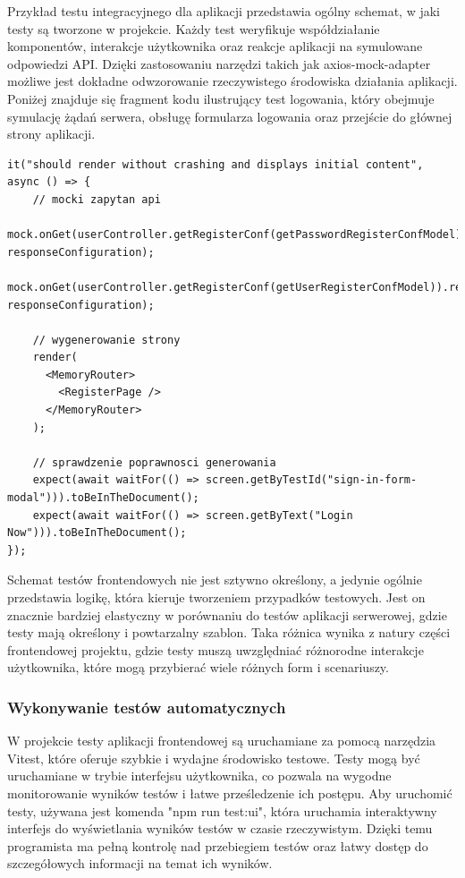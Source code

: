 \documentclass[twoside]{projektInzynierskiMS1}
\begin{document}
\newpage

\noindent
Przykład testu integracyjnego dla aplikacji przedstawia ogólny schemat, w jaki testy są tworzone w projekcie. Każdy test weryfikuje współdziałanie komponentów, interakcje użytkownika oraz reakcje aplikacji na symulowane odpowiedzi API. Dzięki zastosowaniu narzędzi takich jak axios-mock-adapter możliwe jest dokładne odwzorowanie rzeczywistego środowiska działania aplikacji. Poniżej znajduje się fragment kodu ilustrujący test logowania, który obejmuje symulację żądań serwera, obsługę formularza logowania oraz przejście do głównej strony aplikacji.

\vspace{0.5cm}
\begin{lstlisting}[language=JSX]
it("should render without crashing and displays initial content", async () => {
    // mocki zapytan api
    mock.onGet(userController.getRegisterConf(getPasswordRegisterConfModel)).reply(200, responseConfiguration);
    mock.onGet(userController.getRegisterConf(getUserRegisterConfModel)).reply(200, responseConfiguration);

    // wygenerowanie strony
    render(
      <MemoryRouter>
        <RegisterPage />
      </MemoryRouter>
    );

    // sprawdzenie poprawnosci generowania
    expect(await waitFor(() => screen.getByTestId("sign-in-form-modal"))).toBeInTheDocument();
    expect(await waitFor(() => screen.getByText("Login Now"))).toBeInTheDocument();
});
\end{lstlisting}
\vspace{0.5cm}

\noindent
Schemat testów frontendowych nie jest sztywno określony, a jedynie ogólnie przedstawia logikę, która kieruje tworzeniem przypadków testowych. Jest on znacznie bardziej elastyczny w porównaniu do testów aplikacji serwerowej, gdzie testy mają określony i powtarzalny szablon. Taka różnica wynika z natury części frontendowej projektu, gdzie testy muszą uwzględniać różnorodne interakcje użytkownika, które mogą przybierać wiele różnych form i scenariuszy.

\newpage

\subsubsection{Wykonywanie testów automatycznych}

\noindent
W projekcie testy aplikacji frontendowej są uruchamiane za pomocą narzędzia Vitest, które oferuje szybkie i wydajne środowisko testowe. Testy mogą być uruchamiane w trybie interfejsu użytkownika, co pozwala na wygodne monitorowanie wyników testów i łatwe prześledzenie ich postępu. Aby uruchomić testy, używana jest komenda "npm run test:ui", która uruchamia interaktywny interfejs do wyświetlania wyników testów w czasie rzeczywistym. Dzięki temu programista ma pełną kontrolę nad przebiegiem testów oraz łatwy dostęp do szczegółowych informacji na temat ich wyników.
\end{document}

